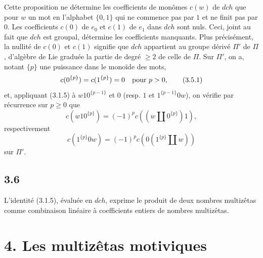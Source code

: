 \documentclass[10pt]{article}
\newcommand{\sh}{\mathbin{\amalg}}
\begin{document}
Cette proposition ne détermine les coefficients de monômes $c(w)$ de $dch$ que pour $w$ un mot en l'alphabet $\{0,1\}$ qui ne commence pas par $1$ et ne finit pas par $0$. Les coefficients $c(0)$ de $e_0$ et $c(1)$ de $e_1$ dans $dch$ sont nuls. Ceci, joint au fait que $dch$ est groupal, détermine les coefficients manquants. Plus précisément, la nullité de $c(0)$ et $c(1)$ signifie que $dch$ appartient au groupe dérivé $\Pi'$ de $\Pi$, d'algèbre de Lie graduée la partie de degré $\geq2$ de celle de $\Pi$. Sur $\Pi'$, on a, notant $\{p\}$ une puissance dans le monoïde des mots,
\begin{equation}
 c(0^{\{p\}})=c(1^{\{p\}})=0\quad\hbox{pour }p>0,
\tag{3.5.1}
\end{equation}
et, appliquant (3.1.5) à $w10^{\{p-1\}}$ et $0$ (resp. $1$ et $1^{\{p-1\}}0w$), on vérifie par récurrence sur $p\geq0$ que
\begin{equation}
 c(w10^{\{p\}})=(-1)^p c((w\sh0^{\{p\}})1),
\tag{3.5.2}
\end{equation}
respectivement
\[
 c(1^{\{p\}}0w)=(-1)^p c(0(1^{\{p\}}\sh w))
\]
sur $\Pi'$.

\subsection*{3.6}
L'identité (3.1.5), évaluée en $dch$, exprime le produit de deux nombres multizêtas comme combinaison linéaire à coefficients entiers de nombres multizêtas.

\section*{4. Les multizêtas motiviques}
\end{document}
